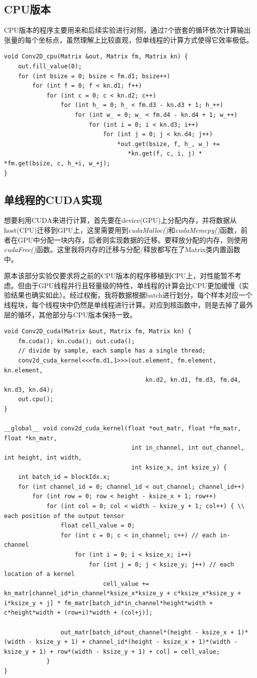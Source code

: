 \documentclass{article}
\begin{document}
\subsection{CPU版本}
CPU版本的程序主要用来和后续实验进行对照，通过7个嵌套的循环依次计算输出张量的每个坐标点，虽然理解上比较直观，但单线程的计算方式使得它效率极低。
\begin{lstlisting}
void Conv2D_cpu(Matrix &out, Matrix fm, Matrix kn) {
	out.fill_value(0);
	for (int bsize = 0; bsize < fm.d1; bsize++)
		for (int f = 0; f < kn.d1; f++)
			for (int c = 0; c < kn.d2; c++)
				for (int h_ = 0; h_ < fm.d3 - kn.d3 + 1; h_++)
					for (int w_ = 0; w_ < fm.d4 - kn.d4 + 1; w_++)
						for (int i = 0; i < kn.d3; i++)
							for (int j = 0; j < kn.d4; j++)
								*out.get(bsize, f, h_, w_) += 
								   *kn.get(f, c, i, j) * *fm.get(bsize, c, h_+i, w_+j);
} 
\end{lstlisting}

\subsection{单线程的CUDA实现}
想要利用CUDA来进行计算，首先要在device(GPU)上分配内存，并将数据从host(CPU)迁移到GPU上，这里需要用到\textit{cudaMalloc()}和\textit{cudaMemcpy()}函数，前者在GPU中分配一块内存，后者则实现数据的迁移。要释放分配的内存，则使用\textit{cudaFree()}函数。这里我将内存的迁移与分配/释放都写在了Matrix类内置函数中。

原本该部分实验仅要求将之前的CPU版本的程序移植到CPU上，对性能暂不考虑。但由于GPU线程并行且轻量级的特性，单线程的计算会比CPU更加缓慢（实验结果也确实如此）。经过权衡，我将数据根据batch进行划分，每个样本对应一个线程块，每个线程块中仍然是单线程进行计算。对应到核函数中，则是去掉了最外层的循环，其他部分与CPU版本保持一致。

\begin{lstlisting}
void Conv2D_cuda(Matrix &out, Matrix fm, Matrix kn) {
	fm.cuda(); kn.cuda(); out.cuda();
	// divide by sample, each sample has a single thread;
	conv2d_cuda_kernel<<<fm.d1,1>>>(out.element, fm.element, kn.element, 
										kn.d2, kn.d1, fm.d3, fm.d4, kn.d3, kn.d4);
	out.cpu();
}

__global__ void conv2d_cuda_kernel(float *out_matr, float *fm_matr, float *kn_matr,
									int in_channel, int out_channel, int height, int width, 
									int ksize_x, int ksize_y) {
	int batch_id = blockIdx.x;
	for (int channel_id = 0; channel_id < out_channel; channel_id++)
		for (int row = 0; row < height - ksize_x + 1; row++)
			for (int col = 0; col < width - ksize_y + 1; col++) { \\ each position of the output tensor
				float cell_value = 0;
				for (int c = 0; c < in_channel; c++) // each in-channel
					for (int i = 0; i < ksize_x; i++) 
						for (int j = 0; j < ksize_y; j++) // each location of a kernel 
							cell_value += kn_matr[channel_id*in_channel*ksize_x*ksize_y + c*ksize_x*ksize_y + i*ksize_y + j] * fm_matr[batch_id*in_channel*height*width + c*height*width + (row+i)*width + (col+j)];
							
				out_matr[batch_id*out_channel*(height - ksize_x + 1)*(width - ksize_y + 1) + channel_id*(height - ksize_x + 1)*(width - ksize_y + 1) + row*(width - ksize_y + 1) + col] = cell_value;
			}
}
\end{lstlisting}
\end{document}
